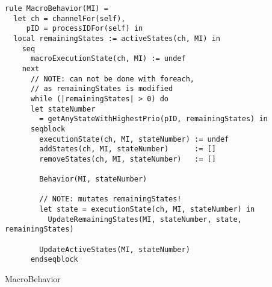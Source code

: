 \begin{listing}[H]
\begin{verbatim}
rule MacroBehavior(MI) =
  let ch = channelFor(self),
     pID = processIDFor(self) in
  local remainingStates := activeStates(ch, MI) in
    seq
      macroExecutionState(ch, MI) := undef
    next
      // NOTE: can not be done with foreach,
      // as remainingStates is modified
      while (|remainingStates| > 0) do
      let stateNumber
        = getAnyStateWithHighestPrio(pID, remainingStates) in
      seqblock
        executionState(ch, MI, stateNumber) := undef
        addStates(ch, MI, stateNumber)      := []
        removeStates(ch, MI, stateNumber)   := []

        Behavior(MI, stateNumber)

        // NOTE: mutates remainingStates!
        let state = executionState(ch, MI, stateNumber) in
          UpdateRemainingStates(MI, stateNumber, state, remainingStates)

        UpdateActiveStates(MI, stateNumber)
      endseqblock
\end{verbatim}
\caption{MacroBehavior}
\label{lst:asm:MacroBehavior}
\end{listing}




